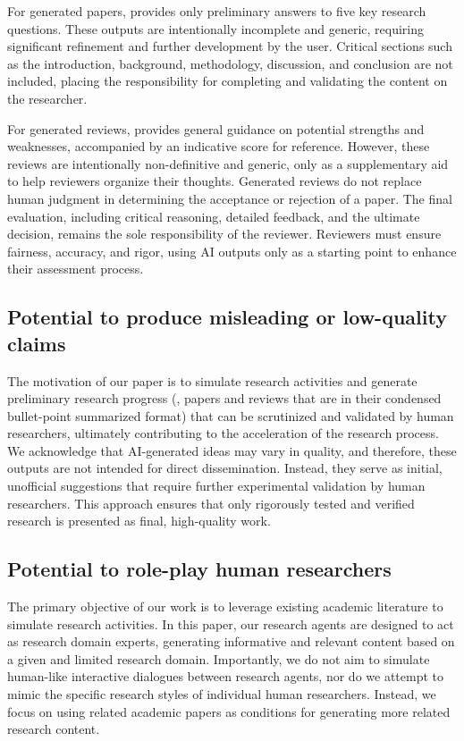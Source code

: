 For generated papers, \envname provides only preliminary answers to five key research questions. These outputs are intentionally incomplete and generic, requiring significant refinement and further development by the user. Critical sections such as the introduction, background, methodology, discussion, and conclusion are not included, placing the responsibility for completing and validating the content on the researcher.

For generated reviews, \envname provides general guidance on potential strengths and weaknesses, accompanied by an indicative score for reference. However, these reviews are intentionally non-definitive and generic, only as a supplementary aid to help reviewers organize their thoughts. Generated reviews do not replace human judgment in determining the acceptance or rejection of a paper. The final evaluation, including critical reasoning, detailed feedback, and the ultimate decision, remains the sole responsibility of the reviewer. Reviewers must ensure fairness, accuracy, and rigor, using AI outputs only as a starting point to enhance their assessment process.

\subsection{Potential to produce misleading or low-quality claims}
The motivation of our paper is to simulate research activities and generate preliminary research progress (\eg, papers and reviews that are in their condensed bullet-point summarized format) that can be scrutinized and validated by human researchers, ultimately contributing to the acceleration of the research process. We acknowledge that AI-generated ideas may vary in quality, and therefore, these outputs are not intended for direct dissemination. Instead, they serve as initial, unofficial suggestions that require further experimental validation by human researchers. This approach ensures that only rigorously tested and verified research is presented as final, high-quality work.

\subsection{Potential to role-play human researchers}
The primary objective of our work is to leverage existing academic literature to simulate research activities. In this paper, our research agents are designed to act as research domain experts, generating informative and relevant content based on a given and limited research domain. Importantly, we do not aim to simulate human-like interactive dialogues between research agents, nor do we attempt to mimic the specific research styles of individual human researchers. Instead, we focus on using related academic papers as conditions for generating more related research content.  

